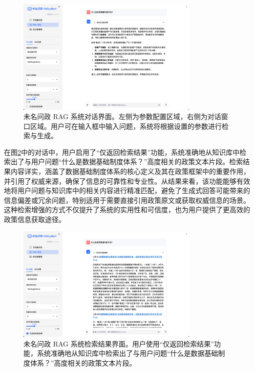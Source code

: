 \documentclass[12pt, a4paper]{ctexart}
\begin{document}
\begin{figure}[H]
    \centering
    \includegraphics[width=0.8\textwidth]{./images/system_running.png}
    \caption{未名问政 RAG 系统对话界面。左侧为参数配置区域，右侧为对话窗口区域。用户可在输入框中输入问题，系统将根据设置的参数进行检索与生成。}
    \label{fig:system_running}
\end{figure}

在图\ref{fig:system_retrieve_only}中的对话中，用户启用了“仅返回检索结果”功能，系统准确地从知识库中检索出了与用户问题“什么是数据基础制度体系？”高度相关的政策文本片段。检索结果内容详实，涵盖了数据基础制度体系的核心定义及其在政策框架中的重要作用，并引用了权威来源，确保了信息的可靠性和专业性。从结果来看，该功能能够有效地将用户问题与知识库中的相关内容进行精准匹配，避免了生成式回答可能带来的信息偏差或冗余问题，特别适用于需要直接引用政策原文或获取权威信息的场景。这种检索增强的方式不仅提升了系统的实用性和可信度，也为用户提供了更高效的政策信息获取途径。

\begin{figure}[H]
    \centering
    \includegraphics[width=0.8\textwidth]{./images/system_retrieve_only.png}
    \caption{未名问政 RAG 系统检索结果界面。用户使用“仅返回检索结果”功能，系统准确地从知识库中检索出了与用户问题“什么是数据基础制度体系？”高度相关的政策文本片段。}
    \label{fig:system_retrieve_only}
\end{figure}
\end{document}
